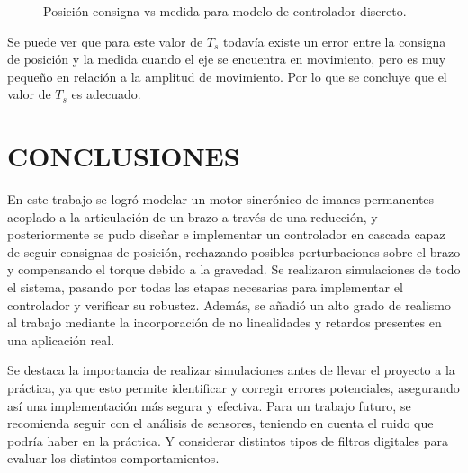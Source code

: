 \documentclass[a4paper, 10pt, onecolumn,journal]{ieeeconf}
\begin{document}
\begin{figure}[H]
	\centering
	\begin{adjustbox}{scale=0.6,max width=\columnwidth}
	\end{adjustbox}
	\caption{Posición consigna vs medida para modelo de controlador discreto.}
	\label{Posición consigna vs medida para modelo de controlador discreto}
\end{figure}
Se puede ver que para este valor de $T_s$ todavía existe un error entre la consigna de posición y la medida cuando el eje se encuentra en movimiento, pero es muy pequeño en relación a la amplitud de movimiento. Por lo que se concluye que el valor de $T_s$ es adecuado. 
\section{CONCLUSIONES}
En este trabajo se logró modelar un motor sincrónico de imanes permanentes acoplado a la articulación de un brazo a través de una reducción, y posteriormente se pudo diseñar e implementar un controlador en cascada capaz de seguir consignas de posición, rechazando posibles perturbaciones sobre el brazo y compensando el torque debido a la gravedad. Se realizaron simulaciones de todo el sistema, pasando por todas las etapas necesarias para implementar el controlador y verificar su robustez. Además, se añadió un alto grado de realismo al trabajo mediante la incorporación de no linealidades y retardos presentes en una aplicación real.

Se destaca la importancia de realizar simulaciones antes de llevar el proyecto a la práctica, ya que esto permite identificar y corregir errores potenciales, asegurando así una implementación más segura y efectiva.
Para un trabajo futuro, se recomienda seguir con el análisis de sensores, teniendo en cuenta el ruido que podría haber en la práctica. Y considerar distintos tipos de filtros digitales para evaluar los distintos comportamientos.
\end{document}
